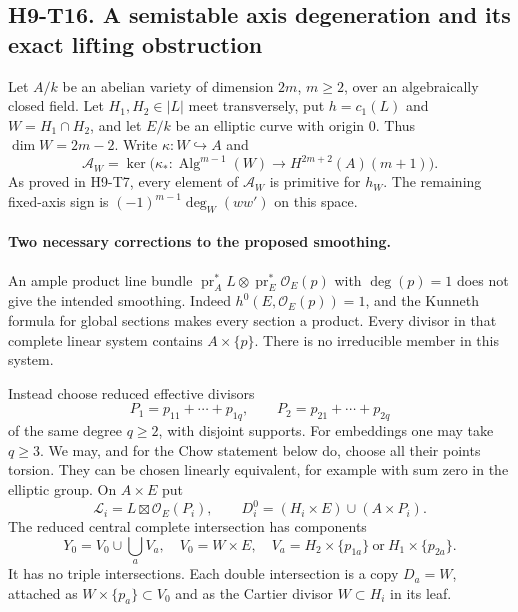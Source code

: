 
\subsection*{H9-T16. A semistable axis degeneration and its exact lifting obstruction}

Let $A/k$ be an abelian variety of dimension $2m$, $m\ge2$, over an
algebraically closed field. Let $H_1,H_2\in|L|$ meet transversely,
put $h=c_1(L)$ and $W=H_1\cap H_2$, and let $E/k$ be an elliptic
curve with origin $0$. Thus $\dim W=2m-2$. Write
$\kappa:W\hookrightarrow A$ and
\[
 \mathcal A_W=\ker\bigl(\kappa_*:
  \operatorname{Alg}^{m-1}(W)\longrightarrow H^{2m+2}(A)(m+1)\bigr).
\]
As proved in H9-T7, every element of $\mathcal A_W$ is primitive
for $h_W$. The remaining fixed-axis sign is
$(-1)^{m-1}\deg_W(ww')$ on this space.

\paragraph{Two necessary corrections to the proposed smoothing.}
An ample product line bundle
$\operatorname{pr}_A^*L\otimes\operatorname{pr}_E^*\mathcal O_E(p)$
with $\deg(p)=1$ does not give the intended smoothing. Indeed
$h^0(E,\mathcal O_E(p))=1$, and the Kunneth formula for global
sections makes every section a product. Every divisor in that
complete linear system contains $A\times\{p\}$. There is no
irreducible member in this system.

Instead choose reduced effective divisors
\[
 P_1=p_{11}+\cdots+p_{1q},\qquad
 P_2=p_{21}+\cdots+p_{2q}
\]
of the same degree $q\ge2$, with disjoint supports. For embeddings
one may take $q\ge3$. We may, and for the Chow statement below do,
choose all their points torsion. They can be chosen linearly
 equivalent, for example with sum zero in the elliptic group.
On $A\times E$ put
\[
 \mathcal L_i=L\boxtimes\mathcal O_E(P_i),\qquad
 D_i^0=(H_i\times E)\cup(A\times P_i).
\]
The reduced central complete intersection has components
\[
 Y_0=V_0\cup\bigcup_a V_a,
 \quad V_0=W\times E,
 \quad V_a=H_2\times\{p_{1a}\}\ \text{or}\ H_1\times\{p_{2a}\}.
                                                               \tag{H9.64}
\]
It has no triple intersections. Each double intersection is a copy
$D_a=W$, attached as $W\times\{p_a\}\subset V_0$ and as the
Cartier divisor $W\subset H_i$ in its leaf.

